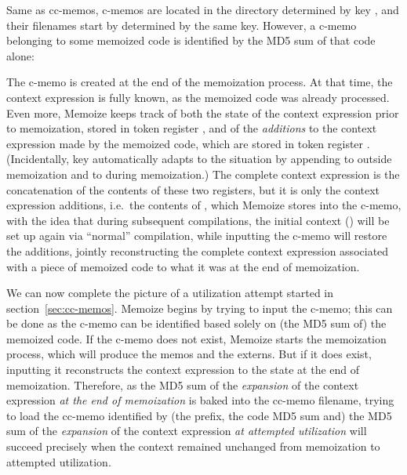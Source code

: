 \documentclass[a4paper,11pt]{article}
\begin{document}
Same as cc-memos, c-memos are located in the directory determined by key
, and their filenames start by  determined by
the same key.  However, a c-memo belonging to some memoized code is identified
by the MD5 sum of that code alone:
\begin{center}
\end{center}

The c-memo is created at the end of the memoization process.  At that time, the
context expression is fully known, as the memoized code was already processed.
Even more, Memoize keeps track of both the state of the context expression
prior to memoization, stored in token register , and of the
\emph{additions} to the context expression made by the memoized code, which are
stored in token register .  (Incidentally, key
 automatically adapts to the situation by appending to
 outside memoization and to  during
memoization.)  The complete context expression is the concatenation of the
contents of these two registers, but it is only the context expression
additions, i.e.\ the contents of , which Memoize stores
into the c-memo, with the idea that during subsequent compilations, the initial
context () will be set up again via ``normal'' compilation,
while inputting the c-memo will restore the additions, jointly reconstructing
the complete context expression associated with a piece of memoized code to
what it was at the end of memoization.

We can now complete the picture of a utilization attempt started in
section~\ref{sec:cc-memos}.  Memoize begins by trying to input the c-memo; this
can be done as the c-memo can be identified based solely on (the MD5 sum of)
the memoized code.  If the c-memo does not exist, Memoize starts the
memoization process, which will produce the memos and the externs.  But if it
does exist, inputting it reconstructs the context expression to the state at
the end of memoization.  Therefore, as the MD5 sum of the \emph{expansion} of
the context expression \emph{at the end of memoization} is baked into the
cc-memo filename, trying to load the cc-memo identified by (the prefix, the
code MD5 sum and) the MD5 sum of the \emph{expansion} of the context expression
\emph{at attempted utilization} will succeed precisely when the context
remained unchanged from memoization to attempted utilization.
\end{document}
